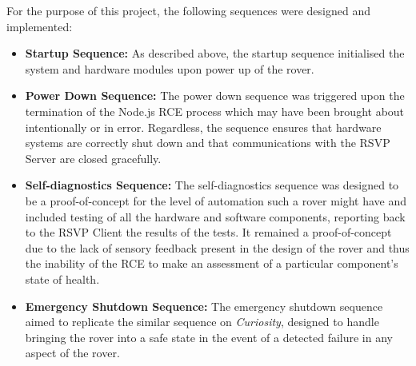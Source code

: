           For the purpose of this project, the following sequences were designed and implemented:
          \begin{itemize}
            \item \textbf{Startup Sequence:} As described above, the startup sequence initialised the system and hardware modules upon power up of the rover.
            \item \textbf{Power Down Sequence:} The power down sequence was triggered upon the termination of the Node.js RCE process which may have been brought about intentionally or in error. Regardless, the sequence ensures that hardware systems are correctly shut down and that communications with the RSVP Server are closed gracefully. 
            \item \textbf{Self-diagnostics Sequence:} The self-diagnostics sequence was designed to be a proof-of-concept for the level of automation such a rover might have and included testing of all the hardware and software components, reporting back to the RSVP Client the results of the tests. It remained a proof-of-concept due to the lack of sensory feedback present in the design of the rover and thus the inability of the RCE to make an assessment of a particular component's state of health.
            \item \textbf{Emergency Shutdown Sequence:} The emergency shutdown sequence aimed to replicate the similar sequence on \textit{Curiosity}, designed to handle bringing the rover into a safe state in the event of a detected failure in any aspect of the rover.
          \end{itemize}
          
